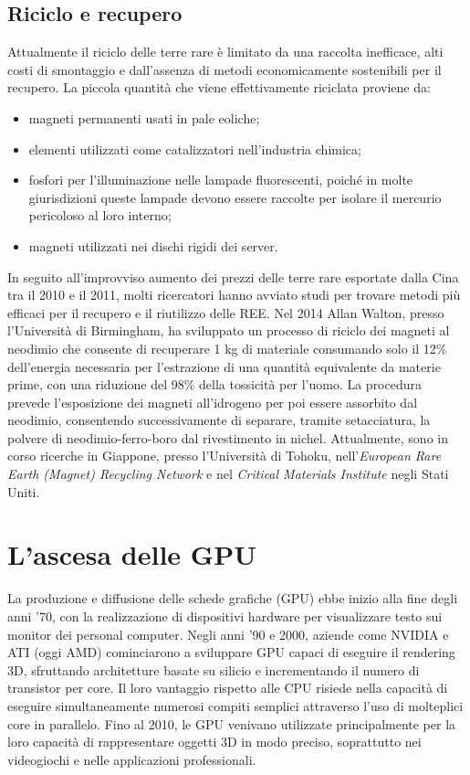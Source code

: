 \documentclass[12pt,a4paper,oneside]{book}
\begin{document}
\section{Riciclo e recupero}
Attualmente il riciclo delle terre rare è limitato da una raccolta inefficace, alti costi di smontaggio e dall'assenza di metodi economicamente sostenibili per il recupero.
La piccola quantità che viene effettivamente riciclata proviene da:
\begin{itemize}
    \item magneti permanenti usati in pale eoliche;
    \item elementi utilizzati come catalizzatori nell'industria chimica;
    \item fosfori per l'illuminazione nelle lampade fluorescenti, poiché in molte giurisdizioni queste lampade devono essere raccolte per isolare il mercurio pericoloso al loro interno;
    \item magneti utilizzati nei dischi rigidi dei server.
\end{itemize}

In seguito all'improvviso aumento dei prezzi delle terre rare esportate dalla Cina tra il 2010 e il 2011, molti ricercatori hanno avviato studi per trovare metodi più efficaci per il recupero e il riutilizzo delle REE.
Nel 2014 Allan Walton, presso l'Università di Birmingham, ha sviluppato un processo di riciclo dei magneti al neodimio che consente di recuperare 1 kg di materiale consumando solo il 12\% dell'energia necessaria per l'estrazione di una quantità equivalente da materie prime, con una riduzione del 98\% della tossicità per l'uomo. La procedura prevede l'esposizione dei magneti all'idrogeno per poi essere assorbito dal neodimio, consentendo successivamente di separare, tramite setacciatura, la polvere di neodimio-ferro-boro dal rivestimento in nichel.
Attualmente, sono in corso ricerche in Giappone, presso l'Università di Tohoku, nell'\textit{European Rare Earth (Magnet) Recycling Network} e nel \textit{Critical Materials Institute} negli Stati Uniti.

\chapter{L'ascesa delle GPU}
La produzione e diffusione delle schede grafiche (GPU) ebbe inizio alla fine degli anni '70, con la realizzazione di dispositivi hardware per visualizzare testo sui monitor dei personal computer. Negli anni '90 e 2000, aziende come NVIDIA e ATI (oggi AMD) cominciarono a sviluppare GPU capaci di eseguire il rendering 3D, sfruttando architetture basate su silicio e incrementando il numero di transistor per core. Il loro vantaggio rispetto alle CPU risiede nella capacità di eseguire simultaneamente numerosi compiti semplici attraverso l'uso di molteplici core in parallelo. Fino al 2010, le GPU venivano utilizzate principalmente per la loro capacità di rappresentare oggetti 3D in modo preciso, soprattutto nei videogiochi e nelle applicazioni professionali.
\end{document}
